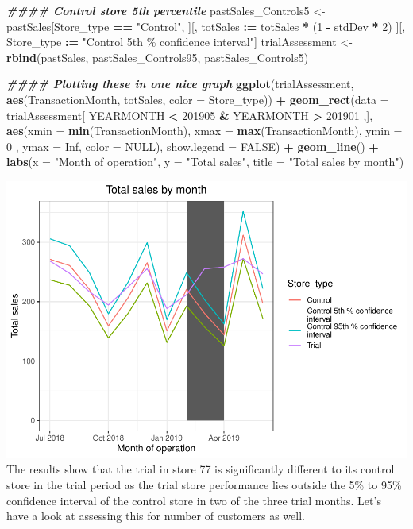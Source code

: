\documentclass[
]{article}
\newenvironment{Shaded}{\begin{snugshade}}{\end{snugshade}}
\newcommand{\AttributeTok}[1]{\textcolor[rgb]{0.13,0.29,0.53}{#1}}
\newcommand{\ConstantTok}[1]{\textcolor[rgb]{0.56,0.35,0.01}{#1}}
\newcommand{\DecValTok}[1]{\textcolor[rgb]{0.00,0.00,0.81}{#1}}
\newcommand{\DocumentationTok}[1]{\textcolor[rgb]{0.56,0.35,0.01}{\textbf{\textit{#1}}}}
\newcommand{\FunctionTok}[1]{\textcolor[rgb]{0.13,0.29,0.53}{\textbf{#1}}}
\newcommand{\NormalTok}[1]{#1}
\newcommand{\OtherTok}[1]{\textcolor[rgb]{0.56,0.35,0.01}{#1}}
\newcommand{\SpecialCharTok}[1]{\textcolor[rgb]{0.81,0.36,0.00}{\textbf{#1}}}
\newcommand{\StringTok}[1]{\textcolor[rgb]{0.31,0.60,0.02}{#1}}
\begin{document}
\begin{Shaded}
\begin{Highlighting}[]
\DocumentationTok{\#\#\#\# Control store 5th percentile}
\NormalTok{pastSales\_Controls5 }\OtherTok{\textless{}{-}}\NormalTok{ pastSales[Store\_type }\SpecialCharTok{==} \StringTok{"Control"}\NormalTok{,}
\NormalTok{ ][, totSales }\SpecialCharTok{:=}\NormalTok{ totSales }\SpecialCharTok{*}\NormalTok{ (}\DecValTok{1} \SpecialCharTok{{-}}\NormalTok{ stdDev }\SpecialCharTok{*} \DecValTok{2}\NormalTok{)}
\NormalTok{ ][, Store\_type }\SpecialCharTok{:=} \StringTok{"Control 5th \% confidence}
\StringTok{interval"}\NormalTok{]}
\NormalTok{trialAssessment }\OtherTok{\textless{}{-}} \FunctionTok{rbind}\NormalTok{(pastSales, pastSales\_Controls95, pastSales\_Controls5)}

\DocumentationTok{\#\#\#\# Plotting these in one nice graph}
\FunctionTok{ggplot}\NormalTok{(trialAssessment, }\FunctionTok{aes}\NormalTok{(TransactionMonth, totSales, }\AttributeTok{color =}\NormalTok{ Store\_type)) }\SpecialCharTok{+}
  \FunctionTok{geom\_rect}\NormalTok{(}\AttributeTok{data =}\NormalTok{ trialAssessment[ YEARMONTH }\SpecialCharTok{\textless{}} \DecValTok{201905} \SpecialCharTok{\&}\NormalTok{ YEARMONTH }\SpecialCharTok{\textgreater{}} \DecValTok{201901}\NormalTok{ ,],}
\FunctionTok{aes}\NormalTok{(}\AttributeTok{xmin =} \FunctionTok{min}\NormalTok{(TransactionMonth), }\AttributeTok{xmax =} \FunctionTok{max}\NormalTok{(TransactionMonth), }\AttributeTok{ymin =} \DecValTok{0}\NormalTok{ , }\AttributeTok{ymax =}
\ConstantTok{Inf}\NormalTok{, }\AttributeTok{color =} \ConstantTok{NULL}\NormalTok{), }\AttributeTok{show.legend =} \ConstantTok{FALSE}\NormalTok{) }\SpecialCharTok{+}
  \FunctionTok{geom\_line}\NormalTok{() }\SpecialCharTok{+}
  \FunctionTok{labs}\NormalTok{(}\AttributeTok{x =} \StringTok{"Month of operation"}\NormalTok{, }\AttributeTok{y =} \StringTok{"Total sales"}\NormalTok{, }\AttributeTok{title =} \StringTok{"Total sales by month"}\NormalTok{)}
\end{Highlighting}
\end{Shaded}

\includegraphics{InsideSherpa_Task2_files/figure-latex/unnamed-chunk-13-1}
The results show that the trial in store 77 is significantly different
to its control store in the trial period as the trial store performance
lies outside the 5\% to 95\% confidence interval of the control store in
two of the three trial months. Let's have a look at assessing this for
number of customers as well.
\end{document}
